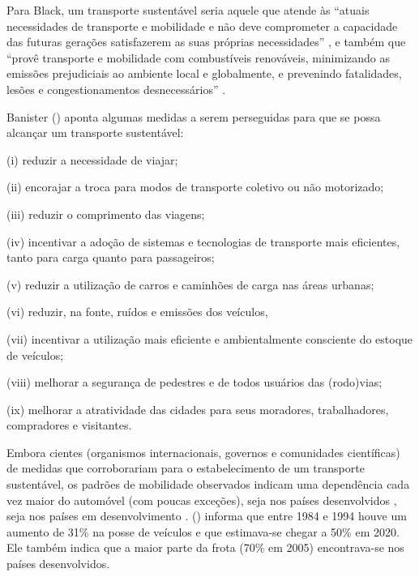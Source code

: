 Para Black, um transporte sustentável seria aquele que atende às ``atuais necessidades de transporte e mobilidade e não deve comprometer a capacidade das futuras gerações satisfazerem as suas próprias necessidades'' \cite[p.151]{BLACK1996}, e também que ``provê transporte e mobilidade com combustíveis renováveis, minimizando as emissões prejudiciais ao ambiente local e globalmente, e prevenindo fatalidades, lesões e congestionamentos desnecessários'' \cite[p.12]{BLACK2010}.

Banister (\citeyear{BANISTER2005,BANISTER2008}) aponta algumas medidas a serem perseguidas para que se possa alcançar um transporte sustentável:
\begin{compactitem}[]
\item (i) reduzir a necessidade de viajar;
\item (ii) encorajar a troca para modos de transporte coletivo ou não motorizado;
\item (iii) reduzir o comprimento das viagens;
\item (iv) incentivar a adoção de sistemas e tecnologias de transporte mais eficientes, tanto para carga quanto para passageiros;
\item (v) reduzir a utilização de carros e caminhões de carga nas áreas urbanas;
\item (vi) reduzir, na fonte, ruídos e emissões dos veículos,
\item (vii) incentivar a utilização mais eficiente e ambientalmente consciente do estoque de veículos;
\item (viii) melhorar a segurança de pedestres e de todos usuários das (rodo)vias;
\item (ix) melhorar a atratividade das cidades para seus moradores, trabalhadores, compradores e visitantes.
\end{compactitem}

Embora cientes (organismos internacionais, governos e comunidades científicas) de medidas que corroborariam para o estabelecimento de um transporte sustentável, os padrões de mobilidade observados indicam uma dependência cada vez maior do automóvel (com poucas exceções), seja nos países desenvolvidos \cite{BANISTER2005}, seja nos países em desenvolvimento \cite{VASCONCELLOS2012}.  (\citeyear{BANISTER2005}) informa que entre 1984 e 1994 houve um aumento de 31\% na posse de veículos e que estimava-se chegar a 50\% em 2020. Ele também indica que a maior parte da frota (70\% em 2005) encontrava-se nos países desenvolvidos.

